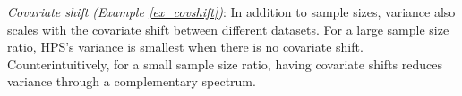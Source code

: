 \textit{Covariate shift (Example \ref{ex_covshift})}: In addition to sample sizes, variance also scales with the covariate shift between different datasets. For a large sample size ratio, HPS's  variance is smallest when there is no covariate shift. Counterintuitively, for a small sample size ratio, having covariate shifts reduces variance through a complementary spectrum.




